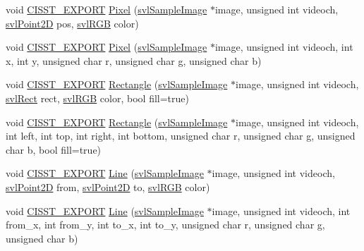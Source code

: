 \begin{DoxyCompactItemize}
\item 
void \hyperlink{cmn_export_macros_8h_a99393e0c3ac434b2605235bbe20684f8}{C\+I\+S\+S\+T\+\_\+\+E\+X\+P\+O\+R\+T} \hyperlink{namespacesvl_draw_a6ced26bb0782fd7b66d21fdfba03caf6}{Pixel} (\hyperlink{classsvl_sample_image}{svl\+Sample\+Image} $\ast$image, unsigned int videoch, \hyperlink{structsvl_point2_d}{svl\+Point2\+D} pos, \hyperlink{structsvl_r_g_b}{svl\+R\+G\+B} color)
\item 
void \hyperlink{cmn_export_macros_8h_a99393e0c3ac434b2605235bbe20684f8}{C\+I\+S\+S\+T\+\_\+\+E\+X\+P\+O\+R\+T} \hyperlink{namespacesvl_draw_a5afdb4fd346733807ca5d3af3e1a8a22}{Pixel} (\hyperlink{classsvl_sample_image}{svl\+Sample\+Image} $\ast$image, unsigned int videoch, int x, int y, unsigned char r, unsigned char g, unsigned char b)
\item 
void \hyperlink{cmn_export_macros_8h_a99393e0c3ac434b2605235bbe20684f8}{C\+I\+S\+S\+T\+\_\+\+E\+X\+P\+O\+R\+T} \hyperlink{namespacesvl_draw_accdb755d3ede3899ecefc2929707f851}{Rectangle} (\hyperlink{classsvl_sample_image}{svl\+Sample\+Image} $\ast$image, unsigned int videoch, \hyperlink{structsvl_rect}{svl\+Rect} rect, \hyperlink{structsvl_r_g_b}{svl\+R\+G\+B} color, bool fill=true)
\item 
void \hyperlink{cmn_export_macros_8h_a99393e0c3ac434b2605235bbe20684f8}{C\+I\+S\+S\+T\+\_\+\+E\+X\+P\+O\+R\+T} \hyperlink{namespacesvl_draw_a4c6b75beb811a810407f6fb262566fb4}{Rectangle} (\hyperlink{classsvl_sample_image}{svl\+Sample\+Image} $\ast$image, unsigned int videoch, int left, int top, int right, int bottom, unsigned char r, unsigned char g, unsigned char b, bool fill=true)
\item 
void \hyperlink{cmn_export_macros_8h_a99393e0c3ac434b2605235bbe20684f8}{C\+I\+S\+S\+T\+\_\+\+E\+X\+P\+O\+R\+T} \hyperlink{namespacesvl_draw_aa6839dcba1603c373ba9ea2e0e6ebaa5}{Line} (\hyperlink{classsvl_sample_image}{svl\+Sample\+Image} $\ast$image, unsigned int videoch, \hyperlink{structsvl_point2_d}{svl\+Point2\+D} from, \hyperlink{structsvl_point2_d}{svl\+Point2\+D} to, \hyperlink{structsvl_r_g_b}{svl\+R\+G\+B} color)
\item 
void \hyperlink{cmn_export_macros_8h_a99393e0c3ac434b2605235bbe20684f8}{C\+I\+S\+S\+T\+\_\+\+E\+X\+P\+O\+R\+T} \hyperlink{namespacesvl_draw_a776cf92bdd4ef25028e5d5868e82fa4f}{Line} (\hyperlink{classsvl_sample_image}{svl\+Sample\+Image} $\ast$image, unsigned int videoch, int from\+\_\+x, int from\+\_\+y, int to\+\_\+x, int to\+\_\+y, unsigned char r, unsigned char g, unsigned char b)

\end{DoxyCompactItemize}
